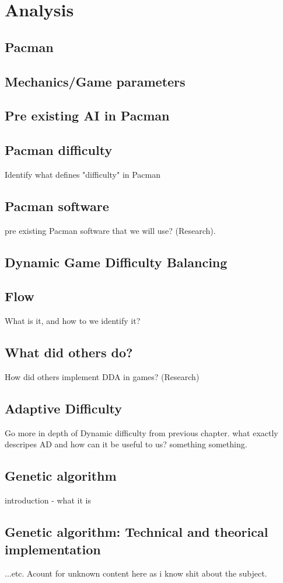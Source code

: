 \section{Analysis} \label{sec:analysis}




\subsection{Pacman}

\subsection{Mechanics/Game parameters}
\subsection{Pre existing AI in Pacman}
\subsection{Pacman difficulty}
Identify what defines "difficulty" in Pacman
\subsection{Pacman software}
pre existing Pacman software that we will use? (Research).




\subsection{Dynamic Game Difficulty Balancing}
\subsection{Flow}
What is it, and how to we identify it?
\subsection{What did others do?}
How did others implement DDA in games? (Research)
\subsection{Adaptive Difficulty}
Go more in depth of Dynamic difficulty from previous chapter. what exactly descripes AD and how can it be useful to us? something something.


\subsection{Genetic algorithm}
introduction - what it is
\subsection{Genetic algorithm: Technical and theorical implementation}
...etc. Acount for unknown content here as i know shit about the subject.

